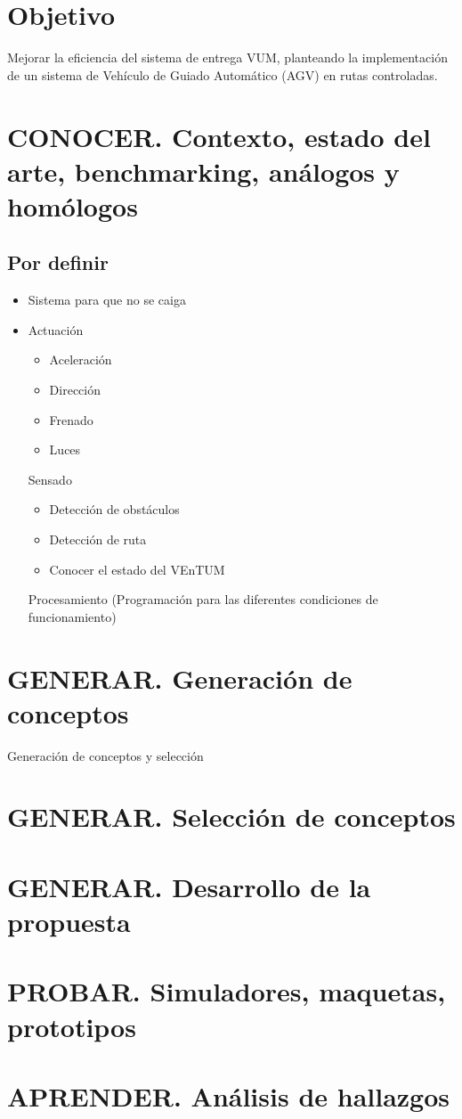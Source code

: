 \section{Objetivo}

Mejorar la eficiencia del sistema de entrega VUM, planteando la implementación de un sistema de Vehículo de Guiado Automático (AGV) en rutas controladas.

\section{CONOCER. Contexto, estado del arte, benchmarking, análogos y homólogos}

\subsection{Por definir}
\begin{itemize}
\item Sistema para que no se caiga
\item Actuación

\begin{itemize}
\item Aceleración
\item Dirección
\item Frenado
\item Luces
\end{itemize}

Sensado
\begin{itemize}
\item Detección de obstáculos
\item Detección de ruta
\item Conocer el estado del VEnTUM
\end{itemize}

Procesamiento (Programación para las diferentes condiciones de funcionamiento)

\end{itemize}




\section{GENERAR. Generación de conceptos}
Generación de conceptos y selección
\section{GENERAR. Selección de conceptos}
\section{GENERAR. Desarrollo de la propuesta}
\section{PROBAR. Simuladores, maquetas, prototipos}

\section{APRENDER. Análisis de hallazgos}
